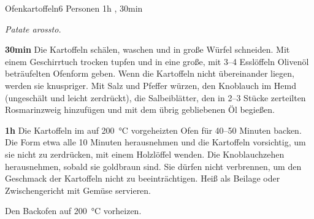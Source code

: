 \documentclass[../recipe-collections/cooking.tex]{subfiles}
\begin{document}
\begin{recipe}{Ofenkartoffeln}{6 Personen }{1h , 30min }

  \freeform{}\textit{Patate arossto.}


  \textbf{30min}
  Die Kartoffeln schälen, waschen und in große Würfel schneiden.
  Mit einem Geschirrtuch trocken tupfen und in eine große, mit 3–4 Esslöffeln Olivenöl beträufelten Ofenform geben.
  Wenn die Kartoffeln nicht übereinander liegen, werden sie knuspriger.
  Mit Salz und Pfeffer würzen, den Knoblauch im Hemd (ungeschält und leicht zerdrückt), die Salbeiblätter, den in 2–3 Stücke zerteilten Rosmarinzweig hinzufügen und mit dem übrig gebliebenen Öl begießen.

  \newstep{}\textbf{1h}
  Die Kartoffeln im auf 200 °C vorgeheizten Ofen für 40–50 Minuten backen.
  Die Form etwa alle 10 Minuten herausnehmen und die Kartoffeln vorsichtig, um sie nicht zu zerdrücken, mit einem Holzlöffel wenden.
  Die Knoblauchzehen herausnehmen, sobald sie goldbraun sind.
  Sie dürfen nicht verbrennen, um den Geschmack der Kartoffeln nicht zu beeinträchtigen.
  Heiß als Beilage oder Zwischengericht mit Gemüse servieren.

  \freeform{}\hrulefill{}

  \freeform{}
  Den Backofen auf 200 °C vorheizen.

\end{recipe}
\end{document}
